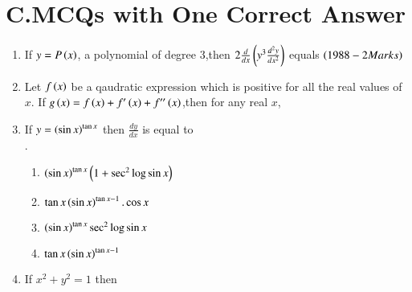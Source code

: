 \documentclass[journal,12pt,onecolumn]{IEEEtran}
\theoremstyle{remark}
\begin{document}
\section*{C.MCQs with One Correct Answer}
\begin{enumerate}
    \item If $y=P\left(x\right)$, a polynomial of degree 3,then $2\frac{d}{dx}\left(y^3\frac{d^2y}{dx^2}\right)$ equals
    $\hfill\brak{1988-2 Marks}$
\begin{enumerate}
\end{enumerate}
\item Let $f\left(x\right)$ be a qaudratic expression which is positive for all the real values of $x$. If $g\left(x\right) = f\left(x\right)+f'\left(x\right)+f''\left(x\right)$,then for any real $x$,
\begin{enumerate}
\end{enumerate}
\item If $y=\left(\sin{x}\right)^{\tan{x}}$ then $\frac{dy}{dx}$ is equal to \\.\hfill{}
\begin{enumerate}
    \item $\left(\sin{x}\right)^{\tan{x}}\left(1+\sec^2{\log{\sin{x}}}\right)$
    \item $\tan{x}\left(\sin{x}\right)^{\tan{x}-1}.\cos{x}$
    \item $\left(\sin{x}\right)^{\tan{x}}\sec^2{\log{\sin{x}}}$
    \item $\tan{x}\left(\sin{x}\right)^{\tan{x}-1}$
\end{enumerate}
\item If $x^2+y^2=1$ then \hfill{}
\begin{enumerate}
\end{enumerate}
\end{enumerate}
\end{document}
